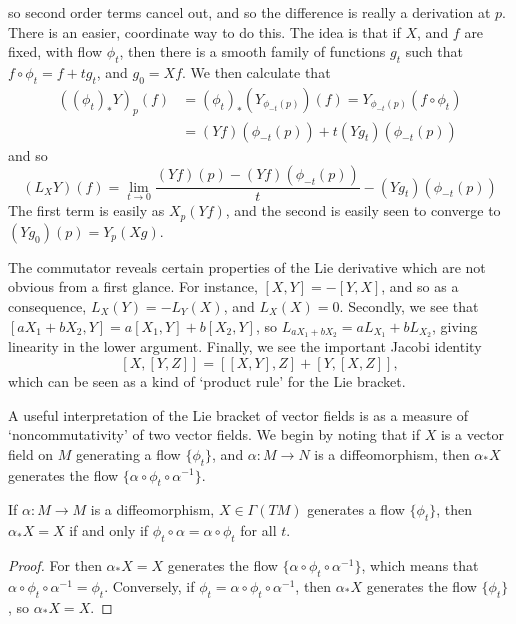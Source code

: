%
so second order terms cancel out, and so the difference is really a derivation at $p$. There is an easier, coordinate way to do this. The idea is that if $X$, and $f$ are fixed, with flow $\phi_t$, then there is a smooth family of functions $g_t$ such that $f \circ \phi_t = f + t g_t$, and $g_0 = Xf$. We then calculate that
%
\begin{align*}
    ((\phi_t)_* Y)_p(f) &= (\phi_t)_*(Y_{\phi_{-t}(p)})(f) = Y_{\phi_{-t}(p)}(f \circ \phi_t)\\
    &= (Yf)(\phi_{-t}(p)) + t (Yg_t)(\phi_{-t}(p))
\end{align*}
%
and so
%
\[ (L_X Y)(f) = \lim_{t \to 0} \frac{(Yf)(p) - (Yf)(\phi_{-t}(p))}{t} - (Yg_t)(\phi_{-t}(p)) \]
%
The first term is easily as $X_p(Yf)$, and the second is easily seen to converge to $(Yg_0)(p) = Y_p(Xg)$.

The commutator reveals certain properties of the Lie derivative which are not obvious from a first glance. For instance, $[X,Y] = -[Y,X]$, and so as a consequence, $L_X(Y) = -L_Y(X)$, and $L_X(X) = 0$. Secondly, we see that $[aX_1 + bX_2,Y] = a[X_1,Y] + b[X_2,Y]$, so $L_{aX_1 + bX_2} = aL_{X_1} + bL_{X_2}$, giving linearity in the lower argument. Finally, we see the important Jacobi identity
%
\[ [X,[Y,Z]] = [[X,Y],Z] + [Y,[X,Z]], \]
%
which can be seen as a kind of `product rule' for the Lie bracket.

A useful interpretation of the Lie bracket of vector fields is as a measure of `noncommutativity' of two vector fields. We begin by noting that if $X$ is a vector field on $M$ generating a flow $\{ \phi_t \}$, and $\alpha: M \to N$ is a diffeomorphism, then $\alpha_* X$ generates the flow $\{ \alpha \circ \phi_t \circ \alpha^{-1} \}$.

\begin{lemma}
    If $\alpha: M \to M$ is a diffeomorphism, $X \in \Gamma(TM)$ generates a flow $\{ \phi_t \}$, then $\alpha_* X = X$  if and only if $\phi_t \circ \alpha = \alpha \circ \phi_t$ for all $t$.
\end{lemma}
\begin{proof}
    For then $\alpha_* X = X$ generates the flow $\{ \alpha \circ \phi_t \circ \alpha^{-1} \}$, which means that $\alpha \circ \phi_t \circ \alpha^{-1} = \phi_t$. Conversely, if $\phi_t = \alpha \circ \phi_t \circ \alpha^{-1}$, then $\alpha_* X$ generates the flow $\{ \phi_t \}$, so $\alpha_* X = X$.
\end{proof}

